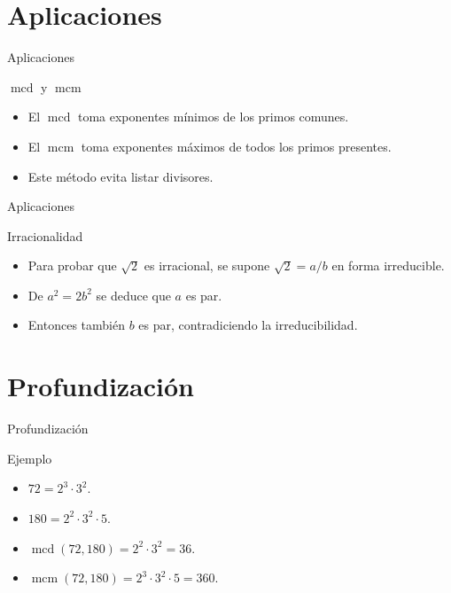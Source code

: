 \documentclass[aspectratio=169,11pt]{beamer}
\newcommand{\mcd}{\operatorname{mcd}}
\newcommand{\mcm}{\operatorname{mcm}}
\begin{document}
\section{Aplicaciones}

\begin{frame}{Aplicaciones}
\begin{block}{\(\mcd\) y \(\mcm\)}
\begin{itemize}
  \item El \(\mcd\) toma exponentes mínimos de los primos comunes.
  \item El \(\mcm\) toma exponentes máximos de todos los primos presentes.
  \item Este método evita listar divisores.
\end{itemize}
\end{block}
\end{frame}

\begin{frame}{Aplicaciones}
\begin{block}{Irracionalidad}
\begin{itemize}
  \item Para probar que \(\sqrt{2}\) es irracional, se supone \(\sqrt{2}=a/b\) en forma irreducible.
  \item De \(a^2=2b^2\) se deduce que \(a\) es par.
  \item Entonces también \(b\) es par, contradiciendo la irreducibilidad.
\end{itemize}
\end{block}
\end{frame}

\section{Profundización}

\begin{frame}{Profundización}
\begin{block}{Ejemplo}
\begin{itemize}
  \item \(72=2^3\cdot 3^2\).
  \item \(180=2^2\cdot 3^2\cdot 5\).
  \item \(\mcd(72,180)=2^2\cdot 3^2=36\).
  \item \(\mcm(72,180)=2^3\cdot 3^2\cdot 5=360\).
\end{itemize}
\end{block}
\end{frame}
\end{document}
